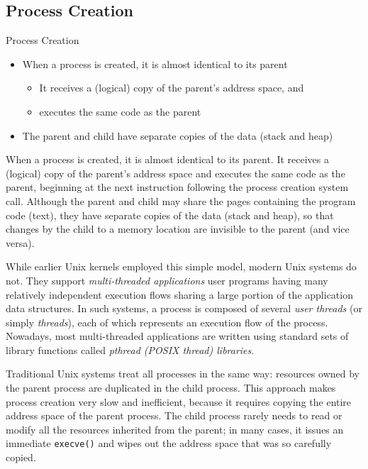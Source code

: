 \subsection{Process Creation}
\label{sec:process-creation}

\begin{frame}{Process Creation}
  \begin{center}
  \end{center}
  \begin{itemize}
  \item When a process is created, it is almost identical to its parent
    \begin{itemize}
    \item It receives a (logical) copy of the parent's address space, and
    \item executes the same code as the parent
    \end{itemize}
  \item The parent and child have separate copies of the data (stack and heap)
  \end{itemize}
\end{frame}


When a process is created, it is almost identical to its parent. It receives a (logical)
copy of the parent's address space and executes the same code as the parent, beginning at
the next instruction following the process creation system call. Although the parent and
child may share the pages containing the program code (text), they have separate copies of
the data (stack and heap), so that changes by the child to a memory location are invisible
to the parent (and vice versa).

While earlier Unix kernels employed this simple model, modern Unix systems do not. They
support \emph{multi-threaded applications} user programs having many relatively
independent execution flows sharing a large portion of the application data structures. In
such systems, a process is composed of several \emph{user threads} (or simply
\emph{threads}), each of which represents an execution flow of the process. Nowadays, most
multi-threaded applications are written using standard sets of library functions called
\emph{pthread (POSIX thread) libraries}.

Traditional Unix systems treat all processes in the same way: resources owned by the
parent process are duplicated in the child process. This approach makes process creation
very slow and inefficient, because it requires copying the entire address space of the
parent process. The child process rarely needs to read or modify all the resources
inherited from the parent; in many cases, it issues an immediate \texttt{execve()} and
wipes out the address space that was so carefully copied.

